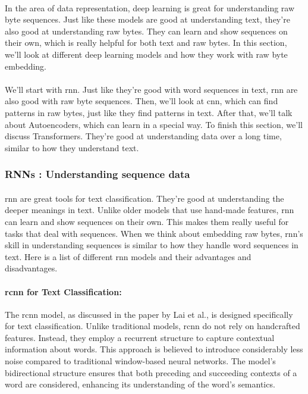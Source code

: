     \paragraph{}In the area of data representation, deep learning is great for understanding raw byte sequences. Just like these models are good at understanding text, they're also good at understanding raw bytes. They can learn and show sequences on their own, which is really helpful for both text and raw bytes. In this section, we'll look at different deep learning models and how they work with raw byte embedding.

    \paragraph{}We'll start with \acrfull{rnn}. Just like they're good with word sequences in text, \acrfull{rnn} are also good with raw byte sequences. Then, we'll look at \acrfull{cnn}, which can find patterns in raw bytes, just like they find patterns in text. After that, we'll talk about Autoencoders, which can learn in a special way. To finish this section, we'll discuss Transformers. They're good at understanding data over a long time, similar to how they understand text.

    \subsubsection{RNNs : Understanding sequence data}
        \paragraph{}\acrfull{rnn} are great tools for text classification. They're good at understanding the deeper meanings in text. Unlike older models that use hand-made features, \acrshort{rnn} can learn and show sequences on their own. This makes them really useful for tasks that deal with sequences. When we think about embedding raw bytes, \acrshort{rnn}'s skill in understanding sequences is similar to how they handle word sequences in text. Here is a list of different \acrshort{rnn} models and their advantages and disadvantages.

        \paragraph{\acrfull{rcnn} for Text Classification\cite{lai_recurrent_2015}:} The \acrshort{rcnn} model, as discussed in the paper by Lai et al., is designed specifically for text classification. Unlike traditional models, \acrshort{rcnn} do not rely on handcrafted features. Instead, they employ a recurrent structure to capture contextual information about words. This approach is believed to introduce considerably less noise compared to traditional window-based neural networks. The model's bidirectional structure ensures that both preceding and succeeding contexts of a word are considered, enhancing its understanding of the word's semantics.

